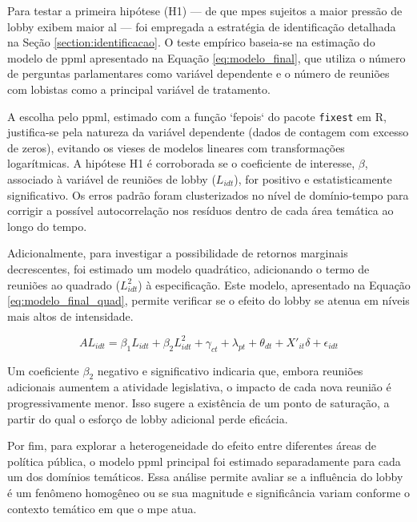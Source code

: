 Para testar a primeira hipótese (H1) — de que \acrshort{mpe}s sujeitos a maior pressão de lobby exibem maior \acrshort{al} — foi empregada a estratégia de identificação detalhada na Seção \ref{section:identificacao}. O teste empírico baseia-se na estimação do modelo de \acrshort{ppml} apresentado na Equação \ref{eq:modelo_final}, que utiliza o número de perguntas parlamentares como variável dependente e o número de reuniões com lobistas como a principal variável de tratamento.

A escolha pelo \acrshort{ppml}, estimado com a função `fepois` do pacote \texttt{fixest} em R, justifica-se pela natureza da variável dependente (dados de contagem com excesso de zeros), evitando os vieses de modelos lineares com transformações logarítmicas. A hipótese H1 é corroborada se o coeficiente de interesse, $\beta$, associado à variável de reuniões de lobby ($L_{idt}$), for positivo e estatisticamente significativo. Os erros padrão foram clusterizados no nível de domínio-tempo para corrigir a possível autocorrelação nos resíduos dentro de cada área temática ao longo do tempo.

Adicionalmente, para investigar a possibilidade de retornos marginais decrescentes, foi estimado um modelo quadrático, adicionando o termo de reuniões ao quadrado ($L_{idt}^2$) à especificação. Este modelo, apresentado na Equação \ref{eq:modelo_final_quad}, permite verificar se o efeito do lobby se atenua em níveis mais altos de intensidade.

\begin{equation}
    \label{eq:modelo_final_quad}
    AL_{idt} = \beta_1 L_{idt} + \beta_2 L_{idt}^2 + \gamma_{ct} + \lambda_{pt} + \theta_{dt} + X'_{it}\delta + \epsilon_{idt}
\end{equation}

Um coeficiente $\beta_2$ negativo e significativo indicaria que, embora reuniões adicionais aumentem a atividade legislativa, o impacto de cada nova reunião é progressivamente menor. Isso sugere a existência de um ponto de saturação, a partir do qual o esforço de lobby adicional perde eficácia.

Por fim, para explorar a heterogeneidade do efeito entre diferentes áreas de política pública, o modelo \acrshort{ppml} principal foi estimado separadamente para cada um dos domínios temáticos. Essa análise permite avaliar se a influência do lobby é um fenômeno homogêneo ou se sua magnitude e significância variam conforme o contexto temático em que o \acrshort{mpe} atua.

